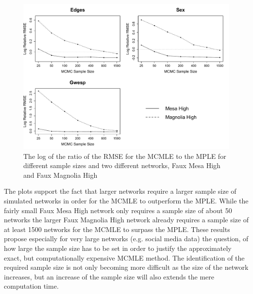 \documentclass[headsepline=true, abstracton]{scrartcl}
\begin{document}
\begin{figure}[h]
\begin{center}
\includegraphics[scale=.5]{RMSE_paper}
\caption{The log of the ratio of the RMSE for the MCMLE to the MPLE for different sample sizes and two different networks, Faux Mesa High and Faux Magnolia High}
\label{rmse}
\end{center}
\end{figure}

\noindent The plots support the fact that larger networks require a larger sample size of simulated networks in order for the MCMLE to outperform the MPLE. While the fairly small Faux Mesa High network only requires a sample size of about 50 networks the larger Faux Magnolia High network already requires a sample size of at least 1500 networks for the MCMLE to surpass the MPLE. These results propose especially for very large networks (e.g. social media data) the question, of how large the sample size has to be set in order to justify the approximately exact, but computationally expensive MCMLE method. The identification of the required sample size is not only becoming more difficult as the size of the network increases, but an increase of the sample size will also extends the mere computation time. 
\end{document}
